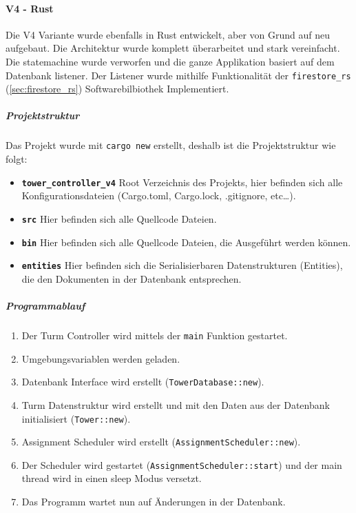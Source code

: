 \paragraph{V4 - Rust}

Die V4 Variante wurde ebenfalls in Rust entwickelt, aber von Grund auf neu aufgebaut. Die Architektur wurde komplett überarbeitet und stark vereinfacht. Die \Gls{statemachine} wurde verworfen und die ganze Applikation basiert auf dem Datenbank \Gls{listener}. Der Listener wurde mithilfe Funktionalität der \texttt{firestore\_rs} (\ref{sec:firestore_rs}) Softwarebilbiothek Implementiert.

\subparagraph{Projektstruktur}

Das Projekt wurde mit \texttt{cargo new} erstellt, deshalb ist die Projektstruktur wie folgt:


\begin{itemize}
  \item \textbf{\texttt{tower\_controller\_v4}} Root Verzeichnis des Projekts, hier befinden sich alle    Konfigurationsdateien (Cargo.toml, Cargo.lock, .gitignore, etc\ldots{}).
  \item \textbf{\texttt{src}} Hier befinden sich alle Quellcode Dateien.
  \item \textbf{\texttt{bin}} Hier befinden sich alle Quellcode Dateien, die Ausgeführt werden können.
  \item \textbf{\texttt{entities}} Hier befinden sich die Serialisierbaren Datenstrukturen (Entities), die den Dokumenten in der Datenbank entsprechen.
\end{itemize}

\subparagraph{Programmablauf}
\begin{enumerate}
  \item Der Turm Controller wird mittels der \texttt{main} Funktion gestartet.
  \item Umgebungsvariablen werden geladen.
  \item Datenbank Interface wird erstellt (\texttt{TowerDatabase::new}).
  \item Turm Datenstruktur wird erstellt und mit den Daten aus der Datenbank initialisiert (\texttt{Tower::new}).
  \item Assignment Scheduler wird erstellt (\texttt{AssignmentScheduler::new}).
  \item Der Scheduler wird gestartet (\texttt{AssignmentScheduler::start}) und der main \Gls{thread} wird in einen \Gls{sleep} Modus versetzt.
  \item Das Programm wartet nun auf Änderungen in der Datenbank.
\end{enumerate}

